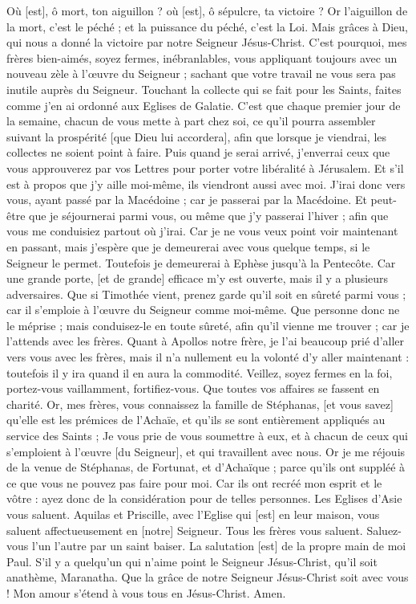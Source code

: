 \begin{multicols}{2}
Où [est], ô mort, ton aiguillon ? où [est], ô sépulcre, ta victoire ?
Or l'aiguillon de la mort, c'est le péché ; et la puissance du péché, c'est la Loi.
Mais grâces à Dieu, qui nous a donné la victoire par notre Seigneur Jésus-Christ.
C'est pourquoi, mes frères bien-aimés, soyez fermes, inébranlables, vous appliquant toujours avec un nouveau zèle à l’œuvre du Seigneur ; sachant que votre travail ne vous sera pas inutile auprès du Seigneur.
\VerseOne{}Touchant la collecte qui se fait pour les Saints, faites comme j'en ai ordonné aux Eglises de Galatie.
C'est que chaque premier jour de la semaine, chacun de vous mette à part chez soi, ce qu'il pourra assembler suivant la prospérité [que Dieu lui accordera], afin que lorsque je viendrai, les collectes ne soient point à faire.
Puis quand je serai arrivé, j'enverrai ceux que vous approuverez par vos Lettres pour porter votre libéralité à Jérusalem.
Et s'il est à propos que j'y aille moi-même, ils viendront aussi avec moi.
J'irai donc vers vous, ayant passé par la Macédoine ; car je passerai par la Macédoine.
Et peut-être que je séjournerai parmi vous, ou même que j'y passerai l'hiver ; afin que vous me conduisiez partout où j’irai.
Car je ne vous veux point voir maintenant en passant, mais j'espère que je demeurerai avec vous quelque temps, si le Seigneur le permet.
Toutefois je demeurerai à Ephèse jusqu'à la Pentecôte.
Car une grande porte, [et de grande] efficace m'y est ouverte, mais il y a plusieurs adversaires.
Que si Timothée vient, prenez garde qu'il soit en sûreté parmi vous ; car il s'emploie à l'œuvre du Seigneur comme moi-même.
Que personne donc ne le méprise ; mais conduisez-le en toute sûreté, afin qu'il vienne me trouver ; car je l'attends avec les frères.
Quant à Apollos notre frère, je l'ai beaucoup prié d'aller vers vous avec les frères, mais il n'a nullement eu la volonté d'y aller maintenant : toutefois il y ira quand il en aura la commodité.
Veillez, soyez fermes en la foi, portez-vous vaillamment, fortifiez-vous.
Que toutes vos affaires se fassent en charité.
Or, mes frères, vous connaissez la famille de Stéphanas, [et vous savez] qu'elle est les prémices de l'Achaïe, et qu'ils se sont entièrement appliqués au service des Saints ;
Je vous prie de vous soumettre à eux, et à chacun de ceux qui s'emploient à l'œuvre [du Seigneur], et qui travaillent avec nous.
Or je me réjouis de la venue de Stéphanas, de Fortunat, et d'Achaïque ; parce qu'ils ont suppléé à ce que vous ne pouvez pas faire pour moi.
Car ils ont recréé mon esprit et le vôtre : ayez donc de la considération pour de telles personnes.
Les Eglises d'Asie vous saluent. Aquilas et Priscille, avec l'Eglise qui [est] en leur maison, vous saluent affectueusement en [notre] Seigneur.
Tous les frères vous saluent. Saluez-vous l'un l'autre par un saint baiser.
La salutation [est] de la propre main de moi Paul.
S'il y a quelqu'un qui n'aime point le Seigneur Jésus-Christ, qu'il soit anathème, Maranatha.
Que la grâce de notre Seigneur Jésus-Christ soit avec vous !
Mon amour s'étend à vous tous en Jésus-Christ. Amen.
\PPE{}
\end{multicols}
